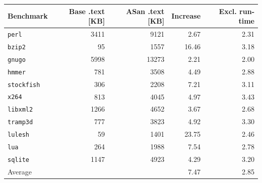 \begin{tabular}{lrrrr}
\toprule
Benchmark & Base .text [KB] & ASan .text [KB] & Increase & Excl. run-time \\
\midrule
\texttt{perl} & 3411 & 9121 & 2.67 & 2.31 \\
\texttt{bzip2} & 95 & 1557 & 16.46 & 3.18 \\
\texttt{gnugo} & 5998 & 13273 & 2.21 & 2.00 \\
\texttt{hmmer} & 781 & 3508 & 4.49 & 2.88 \\
\texttt{stockfish} & 306 & 2208 & 7.21 & 3.11 \\
\texttt{x264} & 813 & 4045 & 4.97 & 3.43 \\
\texttt{libxml2} & 1266 & 4652 & 3.67 & 2.68 \\
\texttt{tramp3d} & 777 & 3823 & 4.92 & 3.30 \\
\texttt{lulesh} & 59 & 1401 & 23.75 & 2.46 \\
\texttt{lua} & 264 & 1988 & 7.54 & 2.78 \\
\texttt{sqlite} & 1147 & 4923 & 4.29 & 3.20 \\
\midrule
Average &  &  & 7.47 & 2.85 \\
\bottomrule
\end{tabular}
